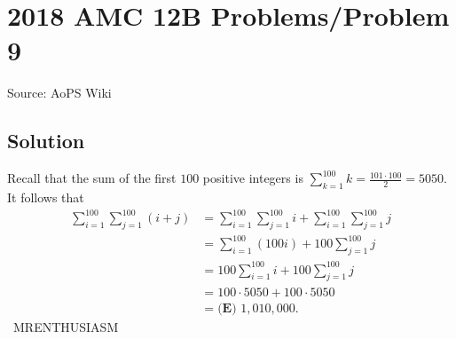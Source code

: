 \documentclass[12pt]{article}
\begin{document}
\section*{{2018 AMC 12B Problems/Problem 9}}
Source: AoPS Wiki

\subsection*{Solution}
Recall that the sum of the first $100$ positive integers is $\sum^{100}_{k=1} k = \frac{101\cdot100}{2}=5050.$ It follows that \begin{align*} \sum^{100}_{i=1} \sum^{100}_{j=1} (i+j) &= \sum^{100}_{i=1} \sum^{100}_{j=1}i + \sum^{100}_{i=1} \sum^{100}_{j=1}j \\ &= \sum^{100}_{i=1} (100i) + 100 \sum^{100}_{j=1}j \\ &= 100 \sum^{100}_{i=1}i + 100 \sum^{100}_{j=1}j \\ &= 100\cdot5050 + 100\cdot5050 \\ &= \boxed{\textbf{(E) }1{,}010{,}000}. \end{align*} ~MRENTHUSIASM
\end{document}

